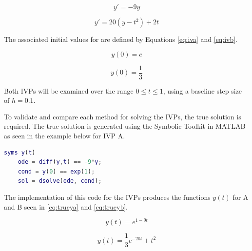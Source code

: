 \documentclass{article}
\begin{document}
\begin{center}
    \centering
    \begin{minipage}{0.5\textwidth}
        \centering
        \begin{equation}
		y' = -9y
		\label{eq:fa}
		\end{equation}
    \end{minipage}\hfill
    \begin{minipage}{0.5\textwidth}
        \centering
        \begin{equation}
        y' = 20 (y-t^2)+2t
		\label{eq:fb}
		\end{equation}
    \end{minipage}
\end{center}


The associated initial values for are defined by Equations \ref{eq:iva} and \ref{eq:ivb}.


\begin{center}
    \centering
    \begin{minipage}{0.5\textwidth}
        \centering
        \begin{equation}
		y(0) = e
		\label{eq:iva}
		\end{equation}
    \end{minipage}\hfill
    \begin{minipage}{0.5\textwidth}
        \centering
        \begin{equation}
        y(0) = \frac{1}{3}
		\label{eq:ivb}
		\end{equation}
    \end{minipage}
\end{center}


Both IVPs will be examined over the range $ 0 \leq t \leq 1 $, using a baseline step size of $h=0.1$.

To validate and compare each method for solving the IVPs, the true solution is required. The true solution is generated using the Symbolic Toolkit in MATLAB as seen in the example below for IVP A.

\bigskip
\begin{lstlisting}[language=Matlab]
	syms y(t)
	ode = diff(y,t) == -9*y;
	cond = y(0) == exp(1);
	sol = dsolve(ode, cond);
\end{lstlisting}
\bigskip

The implementation of this code for the IVPs produces the functions $y(t)$ for A and B seen in \ref{eq:trueya} and \ref{eq:trueyb}.

\begin{center}
    \centering
    \begin{minipage}{0.5\textwidth}
        \centering
        \begin{equation}
		y(t) = e^{1-9t}
		\label{eq:trueya}
		\end{equation}
    \end{minipage}\hfill
    \begin{minipage}{0.5\textwidth}
        \centering
        \begin{equation}
        y(t) = \frac{1}{3}e^{-20t}+t^2
		\label{eq:trueyb}
		\end{equation}
    \end{minipage}
\end{center}
\end{document}
